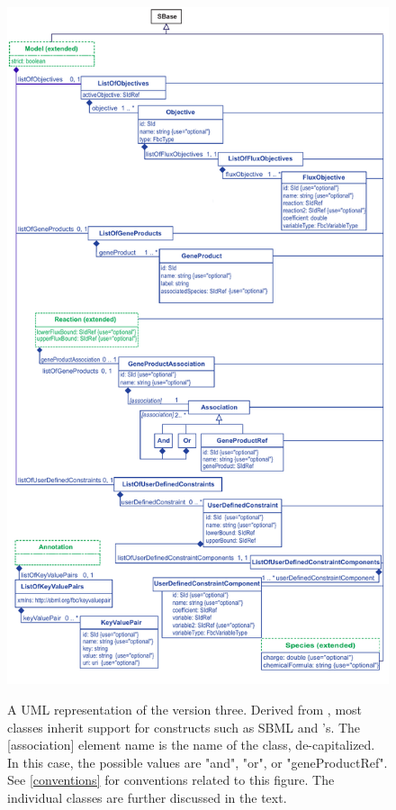 \begin{figure}[ht!]
  \centering
  \includegraphics[height=0.85\textheight]{images/fbc_uml_v3.pdf}\\
  \caption{A UML representation of the \FBCPackage version three. Derived from \SBase, most
	\FBC classes inherit support for constructs such as SBML \Notes and
	\Annotation's. The [association] element name is the name of the class, de-capitalized.  In this case, the possible values are "and", "or", or "geneProductRef". See \ref{conventions} for conventions related to this figure.
	The individual classes are further discussed in the text.}
  \label{fig:fbc_uml}
\end{figure}


